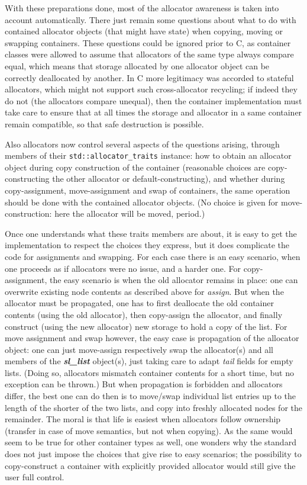 \documentclass[12pt]{article}
\theoremstyle{plain}
\theoremstyle{definition}
\def\PP{\copy\PPbox}
\newcommand\Cee{\textsc{C}}
\newcommand\Cpp{\Cee\PP}
\newcommand\std[1]{\texttt{std::#1}}
\def\slls.{\textbf{\textit{sl\_\!list}}}
\begin{document}
With these preparations done, most of the allocator awareness is taken into
account automatically. There just remain some questions about what to do with
contained allocator objects (that might have state) when copying, moving or
swapping containers. These questions could be ignored prior to \Cpp11, as
container classes were allowed to assume that allocators of the same type always
compare equal, which means that storage allocated by one allocator object can be
correctly deallocated by another. In \Cpp11 more legitimacy was accorded to
stateful allocators, which might not support such cross-allocator recycling; if
indeed they do not (the allocators compare unequal), then the container
implementation must take care to ensure that at all times the storage and
allocator in a same container remain compatible, so that safe destruction is
possible.

Also allocators now control several aspects of the questions arising, through
members of their \std{allocator\_traits} instance: how to obtain an
allocator object during copy construction of the container (reasonable choices
are copy-constructing the other allocator or default-constructing), and whether
during copy-assignment, move-assignment and swap of containers, the same
operation should be done with the contained allocator objects. (No choice is
given for move-construction: here the allocator will be moved, period.)

Once one understands what these traits members are about, it is easy to get the
implementation to respect the choices they express, but it does complicate the
code for assignments and swapping. For each case there is an easy scenario, when
one proceeds as if allocators were no issue, and a harder one. For
copy-assignment, the easy scenario is when the old allocator remains in place:
one can overwrite existing node contents as described above for \textit{assign}.
But when the allocator must be propagated, one has to first deallocate the old
container contents (using the old allocator), then copy-assign the allocator,
and finally construct (using the new allocator) new storage to hold a copy of
the list. For move assignment and swap however, the easy case is propagation of
the allocator object: one can just move-assign respectively swap the
allocator(s) and all members of the \slls. object(s), just taking care to adapt
\textit{tail} fields for empty lists. (Doing so, allocators mismatch container
contents for a short time, but no exception can be thrown.) But when
propagation is forbidden and allocators differ, the best one can do then is to
move/swap individual list entries up to the length of the shorter of the two
lists, and copy into freshly allocated nodes for the remainder. The moral is
that life is easiest when allocators follow ownership (transfer in case of move
semantics, but not when copying). As the same would seem to be true for other
container types as well, one wonders why the standard does not just impose the
choices that give rise to easy scenarios; the possibility to copy-construct a
container with explicitly provided allocator would still give the user full
control.
\end{document}
